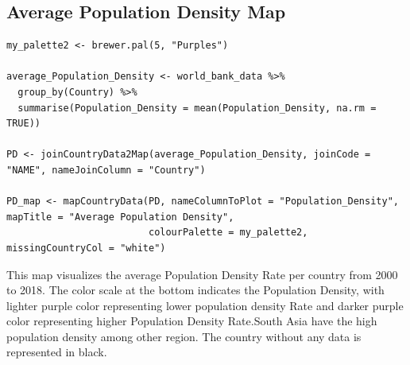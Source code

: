 \documentclass{article}\usepackage[]{graphicx}\usepackage[]{xcolor}
\begin{document}
\subsection{Average Population Density Map}
\begin{lstlisting}
my_palette2 <- brewer.pal(5, "Purples")

average_Population_Density <- world_bank_data %>%
  group_by(Country) %>%
  summarise(Population_Density = mean(Population_Density, na.rm = TRUE))

PD <- joinCountryData2Map(average_Population_Density, joinCode = "NAME", nameJoinColumn = "Country")

PD_map <- mapCountryData(PD, nameColumnToPlot = "Population_Density", mapTitle = "Average Population Density", 
                         colourPalette = my_palette2, missingCountryCol = "white")

\end{lstlisting}
This map visualizes the average Population Density Rate per country from 2000 to 2018. The color scale at the bottom indicates the Population Density, with lighter purple color representing lower population density Rate and darker purple color representing higher Population Density Rate.South Asia have the high population density among other region. The country without any data is represented in black.
\end{document}
